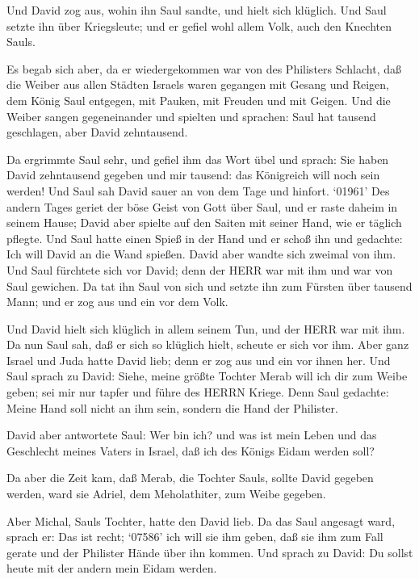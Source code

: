  Und David zog aus, wohin ihn Saul sandte, und hielt sich
klüglich. Und Saul setzte ihn über Kriegsleute; und er gefiel wohl allem
Volk, auch den Knechten Sauls.

 Es begab sich aber, da er wiedergekommen war von des
Philisters Schlacht, daß die Weiber aus allen Städten Israels waren
gegangen mit Gesang und Reigen, dem König Saul entgegen, mit Pauken, mit
Freuden und mit Geigen.  Und die Weiber sangen gegeneinander
und spielten und sprachen: Saul hat tausend geschlagen, aber David
zehntausend.

 Da ergrimmte Saul sehr, und gefiel ihm das Wort übel und
sprach: Sie haben David zehntausend gegeben und mir tausend: das
Königreich will noch sein werden!  Und Saul sah David sauer
an von dem Tage und hinfort.  `01961' Des andern Tages
geriet der böse Geist von Gott über Saul, und er raste daheim in seinem
Hause; David aber spielte auf den Saiten mit seiner Hand, wie er täglich
pflegte. Und Saul hatte einen Spieß in der Hand  und er
schoß ihn und gedachte: Ich will David an die Wand spießen. David aber
wandte sich zweimal von ihm.  Und Saul fürchtete sich vor
David; denn der HERR war mit ihm und war von Saul gewichen.
 Da tat ihn Saul von sich und setzte ihn zum Fürsten über
tausend Mann; und er zog aus und ein vor dem Volk.

 Und David hielt sich klüglich in allem seinem Tun, und der
HERR war mit ihm.  Da nun Saul sah, daß er sich so klüglich
hielt, scheute er sich vor ihm.  Aber ganz Israel und Juda
hatte David lieb; denn er zog aus und ein vor ihnen her. 
Und Saul sprach zu David: Siehe, meine größte Tochter Merab will ich dir
zum Weibe geben; sei mir nur tapfer und führe des HERRN Kriege. Denn
Saul gedachte: Meine Hand soll nicht an ihm sein, sondern die Hand der
Philister.

 David aber antwortete Saul: Wer bin ich? und was ist mein
Leben und das Geschlecht meines Vaters in Israel, daß ich des Königs
Eidam werden soll?

 Da aber die Zeit kam, daß Merab, die Tochter Sauls, sollte
David gegeben werden, ward sie Adriel, dem Meholathiter, zum Weibe
gegeben.

 Aber Michal, Sauls Tochter, hatte den David lieb. Da das
Saul angesagt ward, sprach er: Das ist recht;  `07586' ich
will sie ihm geben, daß sie ihm zum Fall gerate und der Philister Hände
über ihn kommen. Und sprach zu David: Du sollst heute mit der andern
mein Eidam werden.

